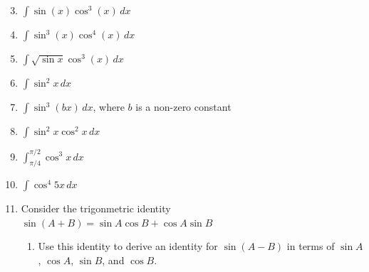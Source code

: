 \documentclass[12pt]{article}
\newif\ifans
\begin{document}
\begin{enumerate}
\setcounter{enumi}{2}

\item $\int \sin{(x)}\cos^3{(x)}\,dx$ 

\ifans{\fbox{$-\frac{1}{4}\cos^4{x}+C$}} \fi

\item $\int \sin^3{(x)}\cos^4{(x)}\,dx$ 

\ifans{\fbox{$\frac{1}{7}\cos^7{x}-\frac{1}{5}\cos^5{x}+C$}} \fi

\item $\int \sqrt{\sin{x}}\cos^{3}{(x)}\,dx$

\ifans{\fbox{$\frac{2}{3}(\sin{x})^{3/2}-\frac{2}{7}(\sin{x})^{7/2}+C$}} \fi

\item $\int \sin^2{x} \,dx$ 

\ifans{\fbox{$\frac{x}{2}-\frac{1}{4}\sin{(2x)}+C$}} \fi

\item $\int \sin^3{(bx)}\,dx$, where $b$ is a non-zero constant

\ifans{\fbox{$\frac{1}{3b}\cos^3{(bx)}-\frac{1}{b}\cos{(bx)}+C$; Detailed Solution: \textcolor{blue}{\href{http://www.math.drexel.edu/classes/Calculus/resources/Math122HW/Solutions/122_15_Trig_Int_07.pdf}{Here}}}} \fi

\item $\int \sin^2{x}\cos^2{x}\,dx$ 

\ifans{\fbox{$\frac{x}{8}-\frac{1}{32}\sin{(4x)}+C$}} \fi

\item $\int_{\pi/4}^{\pi/2} \cos^3{x}\,dx$ 

\ifans{\fbox{$\frac{2}{3}-\frac{5\sqrt{2}}{12}$}} \fi

\item $\int \cos^4{5x}\,dx$

\ifans{\fbox{$\frac{3}{8}x+\frac{1}{20}\sin{(10x)}+\frac{1}{160}\sin{(20x)}+C$}} \fi

\item Consider the trigonmetric identity $\sin{(A+B)}=\sin{A}\cos{B}+\cos{A}\sin{B}$

\begin{enumerate}

\item Use this identity to derive an identity for $\sin{(A-B)}$ in terms of $\sin{A}$, $\cos{A}$, $\sin{B}$, and $\cos{B}$.

\ifans{\fbox{$\sin{(A-B)}=\sin{A}\cos{B}-\cos{A}\sin{B}$}} \fi


\end{enumerate}
\end{enumerate}
\end{document}
